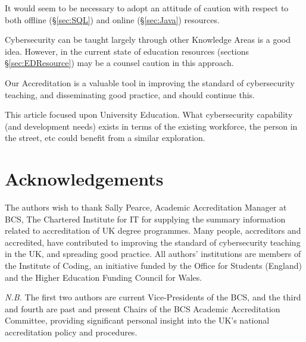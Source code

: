 \documentclass[a4paper,11pt]{article}
\begin{document}
\begin{description}
\item  It  would seem to be necessary to adopt an attitude of caution with respect to both offline (\S\ref{sec:SQL}) and online (\S\ref{sec:Java}) resources. 

\item Cybersecurity can be taught largely through other Knowledge Areas is a good idea.  However, in the current state of education resources (sections \S\ref{sec:EDResource}) may be a counsel caution in this approach. 

\item 
Our Accreditation  is a valuable tool in improving the standard of cybersecurity teaching, and disseminating good practice, and should continue this. 

\item
This article focused upon University Education. What cybersecurity capability (and development needs) exists in terms of the existing workforce,  the person in the street, etc could benefit from a similar exploration.
\end {description}


\section*{Acknowledgements}

 The authors wish to thank Sally Pearce, Academic Accreditation Manager at BCS, The Chartered Institute for IT for supplying the summary information related to accreditation of UK degree programmes. Many people, accreditors and accredited, have contributed to improving the standard of cybersecurity teaching in the UK, and spreading good practice.  All authors' institutions are members of the Institute of Coding, an initiative funded by the Office for Students (England) and the Higher Education Funding Council for Wales.

 {\emph{N.B.}} The first two authors are current Vice-Presidents of the BCS, and the third and fourth are past and present Chairs of the BCS Academic Accreditation Committee, providing significant personal insight into the UK's national accreditation policy and procedures.



\end{document}
